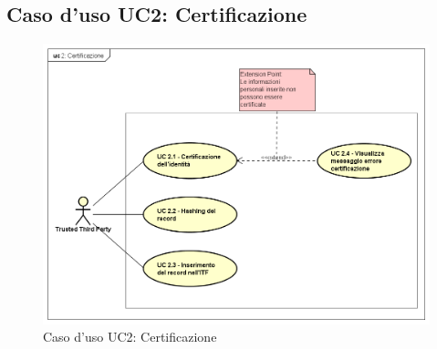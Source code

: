 \subsection{Caso d'uso UC2: Certificazione}
\begin{figure}[h]
	\centering
	\includegraphics[scale=0.50]{immagini/usecase/UC2_Certificazione}
	\caption{Caso d'uso UC2: Certificazione}
\end{figure}
